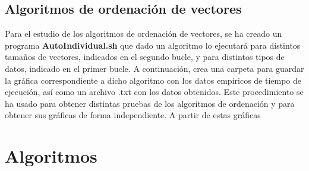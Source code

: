 \documentclass[11pt]{article}
\newcommand{\negrita}[1]{\textbf{#1}}
\begin{document}
    \subsection*{Algoritmos de ordenación de vectores}
    Para el estudio de los algoritmos de ordenación de vectores, se ha creado un programa \negrita{AutoIndividual.sh} que dado un
    algoritmo lo ejecutará para distintos tamaños de vectores, indicados en el segundo bucle, y para
    distintos tipos de datos, indicado en el primer bucle. A continuación, crea una carpeta para guardar la gráfica
    correspondiente a dicho algoritmo con los datos empíricos de tiempo de ejecución, así como un archivo .txt
    con los datos obtenidos. Este procedimiento se ha usado para obtener distintas pruebas de los algoritmos de
    ordenación y para obtener sus gráficas de forma independiente.
    A partir de estas gráficas 
    
\section{Algoritmos}
\end{document}
